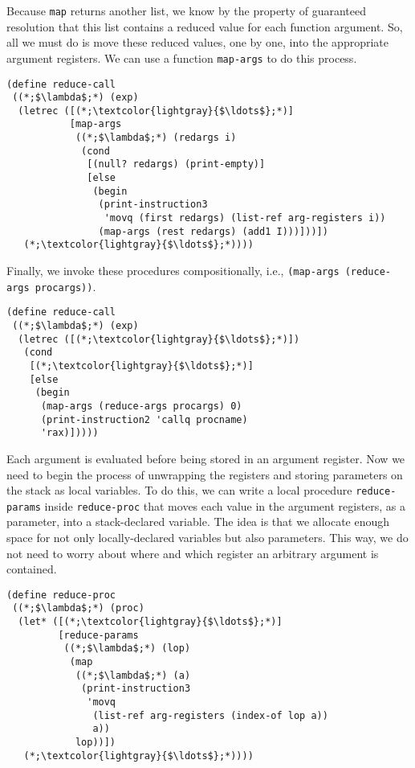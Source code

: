Because \texttt{map} returns another list, we know by the property of guaranteed resolution that this list contains a reduced value for each function argument. So, all we must do is move these reduced values, one by one, into the appropriate argument registers. We can use a function \texttt{map-args} to do this process. 

\begin{cl}[]{}\begin{lstlisting}[language=MyScheme]
(define reduce-call
 ((*;$\lambda$;*) (exp)
  (letrec ([(*;\textcolor{lightgray}{$\ldots$};*)]
           [map-args 
            ((*;$\lambda$;*) (redargs i)
             (cond
              [(null? redargs) (print-empty)]
              [else 
               (begin
                (print-instruction3 
                 'movq (first redargs) (list-ref arg-registers i))
                (map-args (rest redargs) (add1 I)))]))])
   (*;\textcolor{lightgray}{$\ldots$};*))))
\end{lstlisting}\end{cl}

Finally, we invoke these procedures compositionally, i.e., \texttt{(map-args (reduce-args procargs))}.

\begin{cl}[]{}\begin{lstlisting}[language=MyScheme]
(define reduce-call
 ((*;$\lambda$;*) (exp)
  (letrec ([(*;\textcolor{lightgray}{$\ldots$};*)])
   (cond
    [(*;\textcolor{lightgray}{$\ldots$};*)]
    [else
     (begin
      (map-args (reduce-args procargs) 0)
      (print-instruction2 'callq procname)
      'rax)]))))
\end{lstlisting}\end{cl}

Each argument is evaluated before being stored in an argument register. Now we need to begin the process of unwrapping the registers and storing parameters on the stack as local variables. To do this, we can write a local procedure \texttt{reduce-params} inside \texttt{reduce-proc} that moves each value in the argument registers, as a parameter, into a stack-declared variable. The idea is that we allocate enough space for not only locally-declared variables but also parameters. This way, we do not need to worry about where and which register an arbitrary argument is contained.

\begin{cl}[]{}\begin{lstlisting}[language=MyScheme]
(define reduce-proc
 ((*;$\lambda$;*) (proc)
  (let* ([(*;\textcolor{lightgray}{$\ldots$};*)]
         [reduce-params 
          ((*;$\lambda$;*) (lop)
           (map 
            ((*;$\lambda$;*) (a)
             (print-instruction3
              'movq
               (list-ref arg-registers (index-of lop a))
               a))
            lop))])
   (*;\textcolor{lightgray}{$\ldots$};*))))
\end{lstlisting}\end{cl}

